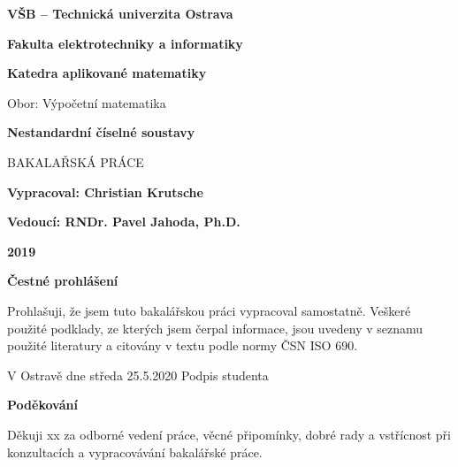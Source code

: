 \documentclass[12pt]{book}
\begin{document}
\begin{titlepage}
	\begin{center}
		\textbf{VŠB – Technická univerzita Ostrava}
		
		\vspace{0.5cm}
		
		\textbf{Fakulta elektrotechniky a informatiky}
		
		\vspace{0.5cm}
		
		\textbf{Katedra aplikované matematiky}
		
		\vspace{1.5cm}
		
		Obor: Výpočetní matematika
		
		\vspace{2.5cm}
		
		\textbf{{\huge Nestandardní číselné soustavy}}
		
		\vspace{1cm}
		
		BAKALAŘSKÁ PRÁCE
		
		\vspace{3cm}
		
		\textbf{Vypracoval: Christian Krutsche}
		
		\vspace{0.5cm}
		
		\textbf{Vedoucí: RNDr. Pavel Jahoda, Ph.D.}
		
		\vspace{1cm}
		
		\textbf{2019}
		
		
		
		
	\end{center}
\end{titlepage}

\vspace{15cm}

\textbf{Čestné prohlášení}

\begin{center}
	Prohlašuji, že jsem tuto bakalářskou práci vypracoval samostatně. Veškeré použité podklady, ze
	kterých jsem čerpal informace, jsou uvedeny v seznamu použité literatury a citovány v textu
	podle normy ČSN ISO 690.
\end{center}

\vspace{2.5cm}

V Ostravě dne středa 25.5.2020
Podpis studenta

\newpage

\begin{center}
	\textbf{Poděkování}
	
	Děkuji xx za odborné vedení práce, věcné připomínky, dobré rady a vstřícnost při
	konzultacích a vypracovávání bakalářské práce.
\end{center}
\end{document}
